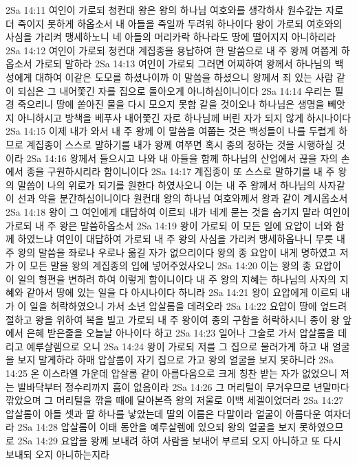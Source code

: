 2Sa 14:11  여인이 가로되 청컨대 왕은 왕의 하나님 여호와를 생각하사 원수갚는 자로 더 죽이지 못하게 하옵소서 내 아들을 죽일까 두려워 하나이다 왕이 가로되 여호와의 사심을 가리켜 맹세하노니 네 아들의 머리카락 하나라도 땅에 떨어지지 아니하리라
2Sa 14:12  여인이 가로되 청컨대 계집종을 용납하여 한 말씀으로 내 주 왕께 여쭙게 하옵소서 가로되 말하라
2Sa 14:13  여인이 가로되 그러면 어찌하여 왕께서 하나님의 백성에게 대하여 이같은 도모를 하셨나이까 이 말씀을 하셨으니 왕께서 죄 있는 사람 같이 되심은 그 내어쫓긴 자를 집으로 돌아오게 아니하심이니이다
2Sa 14:14  우리는 필경 죽으리니 땅에 쏟아진 물을 다시 모으지 못함 같을 것이오나 하나님은 생명을 빼앗지 아니하시고 방책을 베푸사 내어쫓긴 자로 하나님께 버린 자가 되지 않게 하시나이다
2Sa 14:15  이제 내가 와서 내 주 왕께 이 말씀을 여쭙는 것은 백성들이 나를 두렵게 하므로 계집종이 스스로 말하기를 내가 왕께 여쭈면 혹시 종의 청하는 것을 시행하실 것이라
2Sa 14:16  왕께서 들으시고 나와 내 아들을 함께 하나님의 산업에서 끊을 자의 손에서 종을 구원하시리라 함이니이다
2Sa 14:17  계집종이 또 스스로 말하기를 내 주 왕의 말씀이 나의 위로가 되기를 원한다 하였사오니 이는 내 주 왕께서 하나님의 사자같이 선과 악을 분간하심이니이다 원컨대 왕의 하나님 여호와께서 왕과 같이 계시옵소서
2Sa 14:18  왕이 그 여인에게 대답하여 이르되 내가 네게 묻는 것을 숨기지 말라 여인이 가로되 내 주 왕은 말씀하옵소서
2Sa 14:19  왕이 가로되 이 모든 일에 요압이 너와 함께 하였느냐 여인이 대답하여 가로되 내 주 왕의 사심을 가리켜 맹세하옵나니 무릇 내 주 왕의 말씀을 좌로나 우로나 옮길 자가 없으리이다 왕의 종 요압이 내게 명하였고 저가 이 모든 말을 왕의 계집종의 입에 넣어주었사오니
2Sa 14:20  이는 왕의 종 요압이 이 일의 형편을 변하려 하여 이렇게 함이니이다 내 주 왕의 지혜는 하나님의 사자의 지혜와 같아서 땅에 있는 일을 다 아시나이다 하니라
2Sa 14:21  왕이 요압에게 이르되 내가 이 일을 허락하였으니 가서 소년 압살롬을 데려오라
2Sa 14:22  요압이 땅에 엎드려 절하고 왕을 위하여 복을 빌고 가로되 내 주 왕이여 종의 구함을 허락하시니 종이 왕 앞에서 은혜 받은줄을 오늘날 아나이다 하고
2Sa 14:23  일어나 그술로 가서 압살롬을 데리고 예루살렘으로 오니
2Sa 14:24  왕이 가로되 저를 그 집으로 물러가게 하고 내 얼굴을 보지 말게하라 하매 압살롬이 자기 집으로 가고 왕의 얼굴을 보지 못하니라
2Sa 14:25  온 이스라엘 가운데 압살롬 같이 아름다움으로 크게 칭찬 받는 자가 없었으니 저는 발바닥부터 정수리까지 흠이 없음이라
2Sa 14:26  그 머리털이 무거우므로 년말마다 깎았으며 그 머리털을 깎을 때에 달아본즉 왕의 저울로 이백 세겔이었더라
2Sa 14:27  압살롬이 아들 셋과 딸 하나를 낳았는데 딸의 이름은 다말이라 얼굴이 아름다운 여자더라
2Sa 14:28  압살롬이 이태 동안을 예루살렘에 있으되 왕의 얼굴을 보지 못하였으므로
2Sa 14:29  요압을 왕께 보내려 하여 사람을 보내어 부르되 오지 아니하고 또 다시 보내되 오지 아니하는지라
